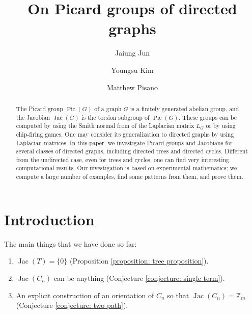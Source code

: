 \documentclass[11pt,reqno]{amsart}
\DeclareMathOperator{\Pic}{Pic}
\DeclareMathOperator{\Jac}{Jac}
\theoremstyle{definition}
\theoremstyle{plain}
\begin{document}
\title{On Picard groups of directed graphs}

\author{Jaiung Jun}
\address{Department of Mathematics, State University of New York at New Paltz, NY 12561, USA}

\author{Youngsu Kim}
\address{Department of Mathematics, California State University San Bernardino, San Bernardino, CA 92407}

\author{Matthew Pisano}
\address{Department of Computer Science, State University of New York at New Paltz, NY 12561, USA}

\makeatletter
{}
\makeatother


\maketitle

\begin{abstract}
The Picard group $\Pic(G)$ of a graph $G$ is a finitely generated abelian group, and the Jacobian $\Jac(G)$ is the torsion subgroup of $\Pic(G)$. These groups can be computed by using the Smith normal from of the Laplacian matrix $L_G$ or by using chip-firing games. One may consider its generalization to directed graphs by using Laplacian matrices. In this paper, we investigate Picard groups and Jacobians for several classes of directed graphs, including directed trees and directed cycles. Different from the undirected case, even for trees and cycles, one can find very interesting computational results. Our investigation is based on experimental mathematics; we compute a large number of examples, find some patterns from them, and prove them. 
\end{abstract}

\section{Introduction}

The main things that we have done so far:
\begin{enumerate}
	\item 
$\Jac(T)=\{0\}$ (Proposition \ref{proposition: tree proposition}). 
\item 
$\Jac(C_n)$ can be anything (Conjecture \ref{conjecture: single term}). 
\item 
An explicit construction of an orientation of $C_n$ so that $\Jac(C_n)=\mathbb{Z}_m$ (Conjecture \ref{conjecture: two path}). 
\end{enumerate}
\end{document}
